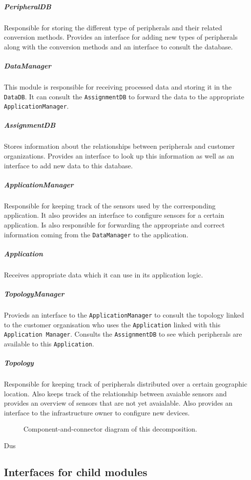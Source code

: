 \documentclass[english]{sareport}
\begin{document}
\subparagraph{PeripheralDB}
Responsible for storing the different type of peripherals and their related conversion methods. Provides an interface for adding new types of peripherals along with the conversion methods and an interface to consult the database.

\subparagraph{DataManager}
This module is responsible for receiving processed data and storing it in the \texttt{DataDB}. It can consult the \texttt{AssignmentDB} to forward the data to the appropriate \texttt{ApplicationManager}.

\subparagraph{AssignmentDB}
Stores information about the relationships between peripherals and customer organizations. Provides an interface to look up this information as well as an interface to add new data to this database.

\subparagraph{ApplicationManager}
Responsible for keeping track of the sensors used by the corresponding application. It also provides an interface to configure sensors for a certain application. Is also responsible for forwarding the appropriate and correct information coming from the \texttt{DataManager} to the application.

\subparagraph{Application}
Receives appropriate data which it can use in its application logic.

\subparagraph{TopologyManager}
Provieds an interface to the \texttt{ApplicationManager} to consult the topology linked to the customer organisation who uses the \texttt{Application} linked with this \texttt{Application Manager}. Consults the \texttt{AssignmentDB} to see which peripherals are available to this \texttt{Application}.

\subparagraph{Topology}
Responsible for keeping track of peripherals distributed over a certain geographic location. Also keeps track of the relationship between avaiable sensors and provides an overview of sensors that are not yet avaialable. Also provides an interface to the infrastructure owner to configure new devices.
\begin{figure}[!htp]
	\centering
	\caption{Component-and-connector diagram of this decomposition.
	}\label{fig:it1-cc_main}
\end{figure}
Dus 
\subsection{Interfaces for child modules}
\end{document}
